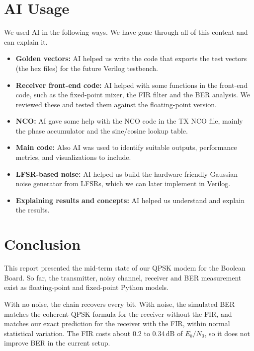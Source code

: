 \documentclass[10pt,twocolumn,letterpaper]{article}
\newcommand{\newstart}{\begingroup\color{blue}}
\newcommand{\newend}{\endgroup}
\begin{document}
\newstart
\section{AI Usage}


We used AI in the following ways. We have gone through all of this content and can explain it.

\begin{itemize}
    \item \textbf{Golden vectors:} AI helped us write the code that exports the test vectors (the hex files) for the future Verilog testbench.
    
    \item \textbf{Receiver front-end code:} AI helped with some functions in the front-end code, such as the fixed-point mixer, the FIR filter and the BER analysis. We reviewed these and tested them against the floating-point version.
    
    
    \item \textbf{NCO:} AI gave some help with the NCO code in the TX NCO file, mainly the phase accumulator and the sine/cosine lookup table.
    
    \item \textbf{Main code:} Also AI was used to identify suitable outputs, performance metrics, and visualizations to include.
    
    \item \textbf{LFSR-based noise:} AI helped us build the hardware-friendly Gaussian noise generator from LFSRs, which we can later implement in Verilog.
    
    \item \textbf{Explaining results and concepts:} AI helped us understand and explain the results.
    
    
\end{itemize}

\newend
\newstart
\section{Conclusion}
This report presented the mid-term state of our QPSK modem for the
Boolean Board. So far, the transmitter, noisy channel, receiver and BER
measurement exist as floating-point and fixed-point Python models.

With no noise, the chain recovers every bit. With noise, the simulated
BER matches the coherent-QPSK formula for the receiver without the FIR,
and matches our exact prediction for the receiver with the FIR, within
normal statistical variation. The FIR costs about 0.2 to 0.34\,dB of
$E_b/N_0$, so it does not improve BER in the current setup.
\end{document}
